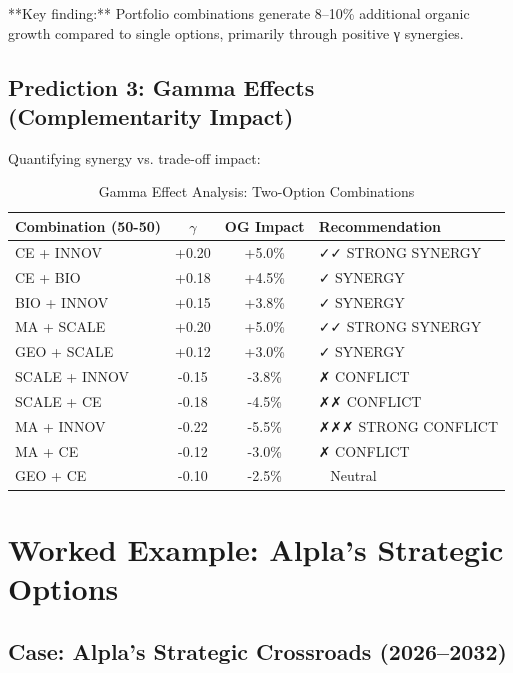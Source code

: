 **Key finding:** Portfolio combinations generate 8--10\% additional organic growth compared to single options, primarily through positive γ synergies.

\subsection{Prediction 3: Gamma Effects (Complementarity Impact)}

Quantifying synergy vs. trade-off impact:

\begin{table}[htbp]
\centering
\caption{Gamma Effect Analysis: Two-Option Combinations}
\label{tab:socm-pred3}
\renewcommand{\arraystretch}{1.3}
\begin{tabular}{@{}lccl@{}}
\toprule
\textbf{Combination (50-50)} & \textbf{$\gamma$} & \textbf{OG Impact} & \textbf{Recommendation} \\
\midrule
CE + INNOV & +0.20 & +5.0\% & ✓✓ STRONG SYNERGY \\
CE + BIO & +0.18 & +4.5\% & ✓ SYNERGY \\
BIO + INNOV & +0.15 & +3.8\% & ✓ SYNERGY \\
MA + SCALE & +0.20 & +5.0\% & ✓✓ STRONG SYNERGY \\
GEO + SCALE & +0.12 & +3.0\% & ✓ SYNERGY \\
\midrule
SCALE + INNOV & -0.15 & -3.8\% & ✗ CONFLICT \\
SCALE + CE & -0.18 & -4.5\% & ✗✗ CONFLICT \\
MA + INNOV & -0.22 & -5.5\% & ✗✗✗ STRONG CONFLICT \\
MA + CE & -0.12 & -3.0\% & ✗ CONFLICT \\
GEO + CE & -0.10 & -2.5\% & ~ Neutral \\
\bottomrule
\end{tabular}
\end{table}

\section{Worked Example: Alpla's Strategic Options}
\label{sec:socm-example}

\subsection{Case: Alpla's Strategic Crossroads (2026--2032)}

